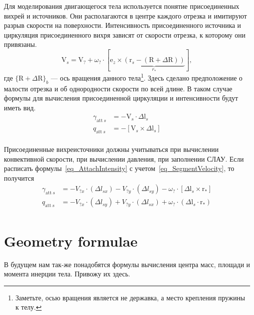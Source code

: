 \documentclass[14pt]{extreport}
\newcommand{\br}[1]{\boldsymbol{\mathrm{#1}}}
\renewcommand{\vec}[1]{\br{#1}}
\newcommand{\att}{\text{att}}
\begin{document}
Для моделирования двигающегося тела используется понятие присоединенных вихрей и источников. Они располагаются в центре каждого отрезка и имитируют разрыв скорости на поверхности. %
Интенсивность присоединенного источника и циркуляция присоединенного вихря зависят от скорости отрезка, к которому они привязаны.
\begin{equation}
\label{eq_SegmentVelocity}
\vec V_s = \vec V_? + \omega_? \cdot [\vec e_z \times \underbrace{(\vec r_s - (\vec R + \Delta \vec R))}_{r_*}],
\end{equation}
где $\lbrace\vec R + \Delta \vec R\rbrace_b$ --- ось вращения данного тела\footnote{Заметьте, осью вращения является не державка, а место крепления пружины к телу.}. Здесь сделано предположение о малости отрезка и об однородности скорости по всей длине. В таком случае формулы для вычисления присоединенной циркуляции и интенсивности будут иметь вид.
\begin{equation}
\label{eq_AttachIntensity}
\begin{split}
\gamma_{\att~s} &= -\vec V_s \cdot \Delta \vec l_s \\
q_{\att~s} &= -[\vec V_s \times \Delta \vec l_s] \\
\end{split}
\end{equation}

Присоединенные вихреисточники должны учитываться при вычислении конвективной скорости, при вычислении давления, при заполнении СЛАУ.
Если расписать формулы~\ref{eq_AttachIntensity} с учетом~\ref{eq_SegmentVelocity}, то получится
\begin{equation}
\label{eq_AttachIntensityLong}
\begin{split}
\gamma_{\att~s} &=
-V_{?x} \cdot (\Delta l_{sx}) - V_{?y} \cdot (\Delta l_{sy}) - \omega_? \cdot [\Delta \vec l_s \times \vec r_*]\\
q_{\att~s} &=
-V_{?x} \cdot (\Delta l_{sy}) + V_{?y} \cdot (\Delta l_{sx}) + \omega_? \cdot (\Delta \vec l_s \cdot \vec r_*)\\
\end{split}
\end{equation}

\section{Geometry formulae}
В будущем нам так-же понадобятся формулы вычисления центра масс, площади и момента инерции тела. Привожу их здесь.
\end{document}
